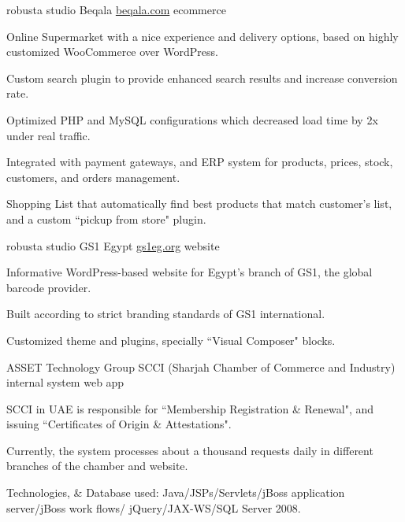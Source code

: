 \begin{cventries}
  \cventry
    {robusta studio} %
    {Beqala} %
    {\href{http://www.beqala.com} {beqala.com}} %
    {ecommerce} %
    {
      \begin{cvitems} %
        \item {Online Supermarket with a nice experience and delivery options, based on highly customized WooCommerce over WordPress.}
        \item {Custom search plugin to provide enhanced search results and increase conversion rate.}
        \item {Optimized PHP and MySQL configurations which decreased load time by 2x under real traffic.}
        \item {Integrated with payment gateways, and ERP system for products, prices, stock, customers, and orders management.}
        \item {Shopping List that automatically find best products that match customer's list, and a custom ``pickup from store" plugin.}
      \end{cvitems}
    }


  \cventry
    {robusta studio} %
    {GS1 Egypt} %
    {\href{http://www.gs1eg.org} {gs1eg.org}} %
    {website} %
    {
      \begin{cvitems} %
        \item {Informative WordPress-based website for Egypt's branch of GS1, the global barcode provider.}
        \item {Built according to strict branding standards of GS1 international.}
        \item {Customized theme and plugins, specially ``Visual Composer" blocks.}
      \end{cvitems}
    }


  \cventry
    {ASSET Technology Group} %
    {SCCI (Sharjah Chamber of Commerce and Industry)} %
    {internal system} %
    {web app} %
    {
      \begin{cvitems} %
        \item {SCCI in UAE is responsible for ``Membership Registration \& Renewal", and issuing ``Certificates of Origin \& Attestations".}
        \item {Currently, the system processes about a thousand requests daily in different branches of the chamber and website.}
        \item {Technologies, \& Database used: Java/JSPs/Servlets/jBoss application server/jBoss work flows/ jQuery/JAX-WS/SQL Server 2008.}
      \end{cvitems}
    }



\end{cventries}

